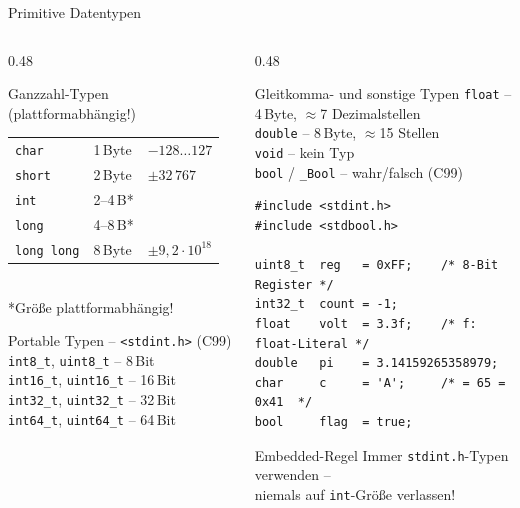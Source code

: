 \documentclass[%
  aspectratio=169,
  10pt
]{beamer}
\begin{document}
\begin{frame}[fragile]{Primitive Datentypen}
  \begin{columns}[T]
    \begin{column}{0.48\textwidth}
      \begin{block}{Ganzzahl-Typen (plattformabhängig!)}
        \small
        \begin{tabular}{l l l}
          \texttt{char}       & 1\,Byte  & $-128 \ldots 127$ \\
          \texttt{short}      & 2\,Byte  & $\pm 32\,767$ \\
          \texttt{int}        & 2--4\,B* & \\
          \texttt{long}       & 4--8\,B* & \\
          \texttt{long long}  & 8\,Byte  & $\pm 9{,}2 \cdot 10^{18}$
        \end{tabular}\\[0.3em]
        \footnotesize{*Größe plattformabhängig!}
      \end{block}
      \begin{exampleblock}{Portable Typen -- \texttt{<stdint.h>} (C99)}
        \texttt{int8\_t},  \texttt{uint8\_t}   -- 8\,Bit\\
        \texttt{int16\_t}, \texttt{uint16\_t}  -- 16\,Bit\\
        \texttt{int32\_t}, \texttt{uint32\_t}  -- 32\,Bit\\
        \texttt{int64\_t}, \texttt{uint64\_t}  -- 64\,Bit
      \end{exampleblock}
    \end{column}
    \begin{column}{0.48\textwidth}
      \begin{block}{Gleitkomma- und sonstige Typen}
        \texttt{float}   -- 4\,Byte, $\approx$7 Dezimalstellen\\
        \texttt{double}  -- 8\,Byte, $\approx$15 Stellen\\
        \texttt{void}    -- kein Typ\\
        \texttt{bool} / \texttt{\_Bool}  -- wahr/falsch (C99)
      \end{block}
\begin{lstlisting}
#include <stdint.h>
#include <stdbool.h>

uint8_t  reg   = 0xFF;    /* 8-Bit Register */
int32_t  count = -1;
float    volt  = 3.3f;    /* f: float-Literal */
double   pi    = 3.14159265358979;
char     c     = 'A';     /* = 65 = 0x41  */
bool     flag  = true;
\end{lstlisting}
      \begin{alertblock}{Embedded-Regel}
        Immer \texttt{stdint.h}-Typen verwenden --\\
        niemals auf \texttt{int}-Größe verlassen!
      \end{alertblock}
    \end{column}
  \end{columns}
\end{frame}
\end{document}
